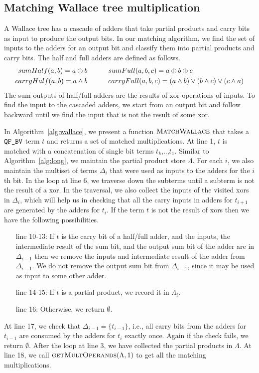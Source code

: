 \subsection{Matching Wallace tree multiplication}


A Wallace tree has a cascade of adders that take partial products 
and carry bits as input to produce the output bits.
%
In our matching algorithm, we find the set of inputs
to the adders for an output bit and classify them into
partial products and carry bits.
%
The half and full adders are defined as follows.
\begin{align*}
sumHalf(a,b) = a \oplus b  \qquad& \quad sumFull(a,b,c) = a \oplus b \oplus c\\
carryHalf(a,b) = a \land b \qquad&\quad
carryFull(a,b,c) = (a \land b) \lor (b \land c) \lor (c \land a)
\end{align*}
%
The sum outputs of half/full adders are the results of xor operations of inputs.
%
To find the input to the cascaded adders, we start from an
output bit and follow backward until we find the input that
is not the result of some xor.

In Algorithm~\ref{alg:wallace}, we present a function
$\textsc{MatchWallace}$ that takes a $\texttt{QF\_BV}$ term $t$ and returns a
set of matched multiplications.
%
At line 1, $t$ is matched with a concatenation of single bit terms $t_k$,..,$t_1$.
%
Similar to Algorithm~\ref{alg:long},
we maintain the partial product store $\Lambda$.
%
For each $i$,
we also maintain the multiset of terms $\Delta_i$ that were used as 
inputs to the adders for the $i$th bit.
%
In the loop at line 6, we traverse down the subterms until
a subterm is not the result of a xor.
%
In the traversal, we also collect the inputs of the visited xors
in $\Delta_i$, which
will help us in checking that all the carry inputs in adders for $t_{i+1}$
are generated by the adders for $t_i$.
%
If the term $t$ is not the result of xors then
we have the following possibilities.
%
\begin{itemize}
\item[line 10-13:]
  If $t$ is the carry bit of a half/full adder, and the inputs, the intermediate
  result of the sum bit, and the output sum bit
  of the adder are in $\Delta_{i-1}$ then we remove the inputs and intermediate result
  of the adder from $\Delta_{i-1}$.
  We do not remove the output sum bit from $\Delta_{i-1}$, since it may be
  used as input to some other adder.
\item[line 14-15:] If $t$ is a partial product, we record it in $\Lambda_i$.
\item[line 16:] Otherwise, we return $\emptyset$.
\end{itemize}
At line 17, we check that $\Delta_{i-1} = \{t_{i-1}\}$, i.e., all carry bits from
the adders for $t_{i-1}$ are consumed by the adders for $t_i$ exactly once.
%
Again if the check fails, we return $\emptyset$.
%
After the loop at line 3, we have collected the partial products in $\Lambda$.
%
At line 18, we call $\textsc{getMultOperands}(\Lambda,1)$ to get all
the matching multiplications.

